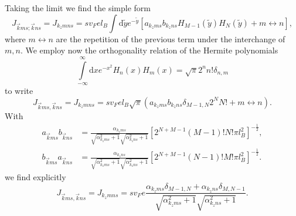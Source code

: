 Taking the limit we find the simple form
\begin{equation}
  \label{eq:52}
  J_{\vec{k} m s; \vec{k} n s} = J_{k_z m n s} =
  s v_F e l_B \int \mathrm{d}\tilde{y} e^{-\tilde{y} }
  \left[
    a_{k_zms} b_{k_z n s} H_{M-1}(\tilde{y} )H_N(\tilde{y} )
    + m \leftrightarrow n
  \right],
\end{equation}
where \( m \leftrightarrow n \) are the repetition of the previous term under the interchange of \( m, n \).
We employ now the orthogonality relation of the Hermite polynomials \cite[Table~18.3.1]{NIST:DLMF}
\begin{equation}
  \label{eq:hermite-ortho}
  \int\limits_{-\infty}^{\infty} \mathrm{d}x e^{-x^2} H_n(x)H_m(x) = \sqrt{\pi} 2^{n} n! \delta_{n,m}
\end{equation}
to write
\begin{equation}
  J_{\vec{k} m s, \vec{k} n s} = J_{k_z m n s}
  = s v_F e l_B \sqrt{\pi} (a_{k_z ms} b_{k_z n s} \delta_{M-1, N} 2^N N! + m \leftrightarrow n).
\end{equation}
With
\begin{align}
  a_{\vec{k}ms}b_{\vec{k}ns} &= 
  \frac{\alpha_{k_z ms} }{
    \sqrt{\alpha _{k_z ms}^2 +1}
    \sqrt{\alpha _{k_z ns}^2 + 1}
  }
  \left[ 2^{N+M-1} (M-1)! N! \pi l_B^2 \right]^{-\frac{1}{2}},\\
  b_{\vec{k}ms}a_{\vec{k} ns} &= 
  \frac{\alpha_{k_z ns} }{
    \sqrt{\alpha _{k_z ms}^2 +1}
    \sqrt{\alpha _{k_z ns}^2 + 1}
  }
  \left[ 2^{N+M-1} (N-1)! M! \pi l_B^2 \right]^{-\frac{1}{2}}.
\end{align}
we find explicitly
\begin{equation}
  J_{\vec{k} m s, \vec{k} n s} = J_{k_z m n s} =
  s v_F e
  \frac{\alpha_{k_z m s} \delta_{M-1, N} + \alpha_{k_z n s} \delta_{M, N-1}}{\sqrt{\alpha _{k_z m s}^2 + 1} \sqrt{\alpha _{k_z n s}^2 + 1}}.
\end{equation}


